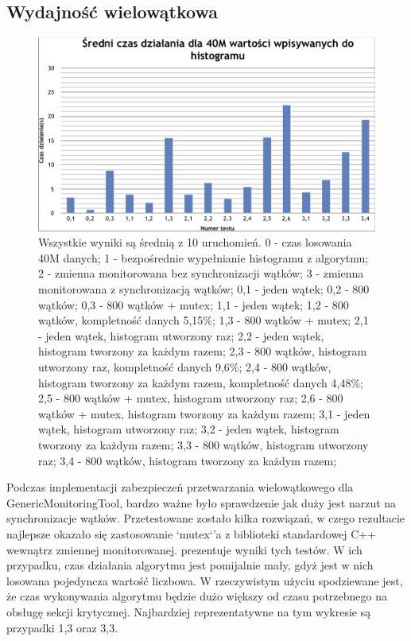\subsection{Wydajność wielowątkowa}

\begin{figure}[!ht]
\centering
\includegraphics[width=1\textwidth]{img/avg_run_time.png}
\caption{
Wszystkie wyniki są średnią z 10 uruchomień.
0 - czas losowania 40M danych; 
1 - bezpośrednie wypełnianie histogramu z algorytmu;
2 - zmienna monitorowana bez synchronizacji wątków;
3 - zmienna monitorowana z synchronizacją wątków;
0,1 - jeden wątek;
0,2 - 800 wątków;
0,3 - 800 wątków + mutex;
1,1 - jeden wątek;
1,2 - 800 wątków, kompletność danych 5,15\%;
1,3 - 800 wątków + mutex;
2,1 - jeden wątek, histogram utworzony raz;
2,2 - jeden wątek, histogram tworzony za każdym razem;
2,3 - 800 wątków, histogram utworzony raz, kompletność danych 9,6\%;
2,4 - 800 wątków, histogram tworzony za każdym razem, kompletność danych 4,48\%;
2,5 - 800 wątków + mutex, histogram utworzony raz;
2,6 - 800 wątków + mutex, histogram tworzony za każdym razem;
3,1 - jeden wątek, histogram utworzony raz;
3,2 - jeden wątek, histogram tworzony za każdym razem;
3,3 - 800 wątków, histogram utworzony raz;
3,4 - 800 wątków, histogram tworzony za każdym razem;
}
\label{fig:athena:avgRunTime}
\end{figure}

Podczas implementacji zabezpieczeń przetwarzania wielowątkowego dla GenericMonitoringTool, bardzo ważne było sprawdzenie jak duży jest narzut na synchronizacje wątków. 
Przetestowane zostało kilka rozwiązań, w czego rezultacie najlepsze okazało się zastosowanie `mutex`'a z biblioteki standardowej C++ wewnątrz zmiennej monitorowanej. 
 prezentuje wyniki tych testów. 
W ich przypadku, czas działania algorytmu jest pomijalnie mały, gdyż jest w nich losowana pojedyncza wartość liczbowa.
W rzeczywistym użyciu spodziewane jest, że czas wykonywania algorytmu będzie dużo większy od czasu potrzebnego na obsługę sekcji krytycznej. 
Najbardziej reprezentatywne na tym wykresie są przypadki 1,3 oraz 3,3.

